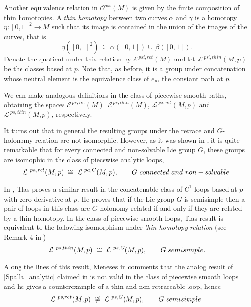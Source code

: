\documentclass{amsart}
\newcommand{\I}{{\mathcal{O}}}
\begin{document}
Another equivalence relation in $\I^{psi}(M)$ is given by the finite composition of thin homotopies. A \emph{thin homotopy} between two curves $\alpha$ and $\gamma$ is a homotopy $\eta: [0,1]^2\rightarrow M$ such that its image is contained in the union of the images of the curves, that is
$$\eta\left([0,1]^2\right)\,\subseteq\,\alpha\left([0,1]\right)\,\cup\,\beta\left([0,1]\right).$$
Denote the quotient under this relation by ${\mathcal E}^{\,psi,ret}(M)$ and let $\mathcal{L}^{\ psi,thin}(M,p)$ be the classes based at $p$. Note that, as before, it is a group under concatenation 
whose neutral element is the equivalence class of $e_p$, the constant path at $p$.

We can make analogous definitions in the class of piecewise smooth paths, obtaining the spaces ${\mathcal E}^{\,ps,ret}(M)$, ${\mathcal E}^{\,ps,thin}(M)$, ${\mathcal L}^{\ ps,ret}(M,p)$ and $\mathcal{L}^{\ ps,thin}(M,p)$, respectively.



It turns out that in general the resulting groups under the retrace and $G$-holonomy relation are not isomorphic. However, as it was shown in \cite{Holonomy}, it is quite remarkable that for every connected and non-solvable Lie group $G$, these groups are isomophic in the class of piecewise analytic loops,
\begin{equation}\label{Spalla_analytic}
\mathcal{L}^{\ pa,ret}(M,p)\ \cong\ \mathcal{L}^{\ pa,G}(M,p),\qquad G\ \rm{connected\ and\ non-solvable.}
\end{equation}

In \cite{Tlas}, Tlas proves a similar result in the concatenable class of $C^1$ loops based at $p$ with zero derivative at $p$. He proves that if the Lie group $G$ is semisimple then a pair of loops in this class are $G$-holonomy related if and only if they are related by a thin homotopy. In the class of piecewise smooth loops, Tlas result is equivalent to the following isomorphism under \emph{thin homotopy relation} (see Remark $4$ in \cite{Meneses})
\begin{equation}\label{Tlas}
\mathcal{L}^{\ ps,thin}(M,p)\ \cong\ \mathcal{L}^{\ ps,G}(M,p),\qquad G\ \rm{semisimple.}
\end{equation}


Along the lines of this result, Meneses in \cite{Meneses} comments that the analog result of \eqref{Spalla_analytic} claimed in \cite{Holonomy} is not valid in the class of piecewise smooth loops and he gives a counterexample of a thin and non-retraceable loop, hence
\begin{equation}\label{Spalla_smooth}
\mathcal{L}^{\ ps,ret}(M,p)\ \not\cong\ \mathcal{L}^{\ ps,G}(M,p),\qquad G\ \rm{semisimple.}
\end{equation}
\end{document}
